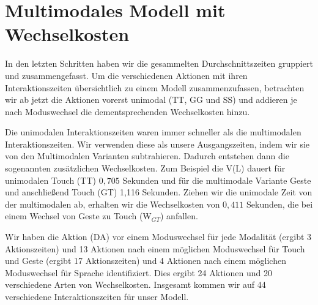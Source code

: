 \section[Multimodales Modell]{Multimodales Modell mit Wechselkosten}
In den letzten Schritten haben wir die gesammelten Durchschnittszeiten gruppiert und zusammengefasst. 
Um die verschiedenen Aktionen mit ihren Interaktionszeiten übersichtlich zu einem Modell zusammenzufassen, betrachten wir ab jetzt die Aktionen vorerst unimodal (TT, GG und SS) und addieren je nach Moduswechsel die dementsprechenden Wechselkosten hinzu. 

Die unimodalen Interaktionszeiten waren immer schneller als die multimodalen Interaktionszeiten. Wir verwenden diese als unsere Ausgangszeiten, indem wir sie von den Multimodalen Varianten subtrahieren. Dadurch entstehen dann die sogenannten zusätzlichen Wechselkosten. Zum Beispiel die V(L) dauert für unimodalen Touch (TT) $0,705$ Sekunden und für die multimodale Variante Geste und anschließend Touch (GT) 1,116 Sekunden. Ziehen wir die unimodale Zeit von der multimodalen ab, erhalten wir die Wechselkosten von $0,411$ Sekunden, die bei einem Wechsel von Geste zu Touch (W$_{GT}$) anfallen. 

Wir haben die Aktion (DA) vor einem Moduswechsel für jede Modalität (ergibt 3 Aktionszeiten) und 13 Aktionen nach einem möglichen Moduswechsel für Touch und Geste (ergibt 17 Aktionszeiten) und 4 Aktionen nach einem möglichen Moduswechsel für Sprache identifiziert. 
Dies ergibt 24 Aktionen und 20 verschiedene Arten von Wechselkosten.
Insgesamt kommen wir auf 44 verschiedene Interaktionszeiten für unser Modell.

